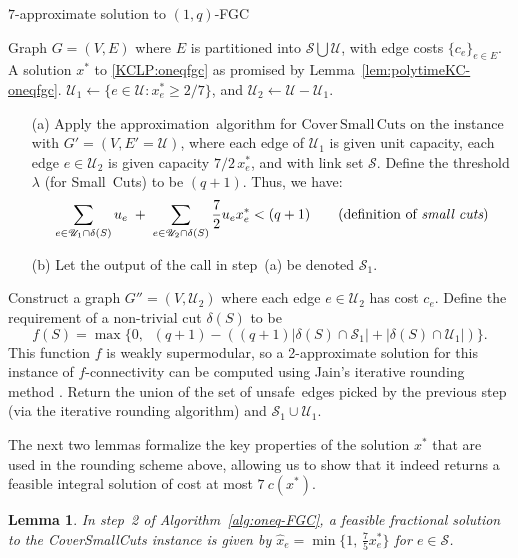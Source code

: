 \documentclass[11pt]{article}
\newtheorem{lemma}[theorem]{Lemma}
\newcommand{\safe}{\mathscr{S}}
\newcommand{\unsafe}{\mathscr{U}}
\newcommand{\oneqfgcapx}{7}
\newcommand\ASC{\mathrm{Cover\,Small\,Cuts}}
\begin{document}
{{
 \begin{algorithm}
     \caption{$\oneqfgcapx$-approximate solution to $(1,{q})$-FGC} \label{alg:oneq-FGC}
     \begin{algorithmic}[1]
         \Require Graph $G=(V,E)$ where $E$ is partitioned into $\safe\bigcup\unsafe$, with edge costs $\{c_e\}_{e\in E}$.  A solution $x^*$ to \eqref{KCLP:oneqfgc} as promised by Lemma~\ref{lem:polytimeKC-oneqfgc}.
         \State $\unsafe_{1} \gets \{e\in \unsafe : x^*_e \geq 2/7\}$, and $\unsafe_{2} \gets \unsafe - \unsafe_1$.
         \State
		\vspace{-4ex}
		{\begin{itemize}
             \item[(a)] Apply the approximation~algorithm for $\ASC$ on the instance with
		$G'=(V,E' = \unsafe)$,
		where each edge of $\unsafe_1$ is given unit capacity,
		each edge $e\in\unsafe_2$ is given capacity ${7/2}\,x^*_e$,
		and with link set $\safe$.
		Define the threshold $\lambda$ (for Small~Cuts) to be $(q+1)$. Thus, we have:
\[
\sum_{e\in \unsafe_1\cap\delta(S)}u_e \;+\; \sum_{e\in \unsafe_2\cap\delta(S)}\frac{7}{2} u_ex^*_e < (q+1) \tag{definition of {\em small cuts}}
\]
             \item[(b)]  Let the output of the call in step~(a) be denoted $\safe_{1}$.
		\end{itemize}}
         \State Construct a graph $G''=(V,\unsafe_{2})$ where each edge $e\in \unsafe_{2}$ has cost $c_e$.
		Define the requirement of a non-trivial cut $\delta(S)$ to be
$$f(S) = \max\{ 0,\;\; (q+1) - ((q+1) |\delta(S)\cap \safe_{1}| + |\delta(S)\cap \unsafe_{1}|) \}.$$
		This function $f$ is weakly supermodular, so a 2-approximate solution for
		this instance of $f$-connectivity can be computed using Jain's
		iterative rounding method \cite{Jain01}.
         \State Return the union of the set of unsafe~edges picked by the previous step (via the iterative rounding algorithm) and $\safe_{1} \cup \unsafe_{1}$.
     \end{algorithmic}
 \end{algorithm}
}


The next two lemmas formalize the key properties of the solution $x^*$ that are used in the rounding scheme above, allowing us to show that it indeed returns a feasible integral solution of cost at most 
$\oneqfgcapx\ c(x^*)$.

{
\begin{lemma}\label{lem:oneqfgc1}
In step~2 of Algorithm~\ref{alg:oneq-FGC}, a feasible fractional
solution to the CoverSmallCuts instance is given by
	$\hat{x}_e = \min\{1,\, \frac{7}{5} x^*_e\}$ for $e\in \safe$.
\end{lemma}

}}
\end{document}
